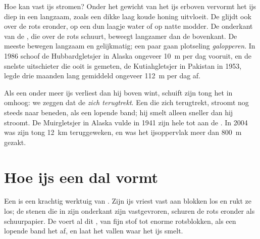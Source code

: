 Hoe kan vast ijs stromen? Onder het gewicht van het ijs erboven vervormt
het ijs diep in een  langzaam, zoals een dikke laag koude honing
uitvloeit. De  glijdt ook over de rots eronder, op een dun laagje
water of op natte modder. De onderkant van de , die over de rots
schuurt, beweegt langzamer dan de bovenkant. De meeste  bewegen
langzaam en gelijkmatig; een paar gaan plotseling \emph{galopperen}. In
1986 schoof de Hubbardgletsjer in Alaska ongeveer \qty{10}{m} per dag
vooruit, en de snelste uitschieter die ooit is gemeten, de
Kutiahgletsjer in Pakistan in 1953, legde drie maanden lang gemiddeld
ongeveer \qty{112}{m} per dag af.

Als een  onder meer ijs verliest dan hij boven wint, schuift zijn
tong het  in omhoog: we zeggen dat de  \emph{zich terugtrekt}.
Een  die zich terugtrekt, stroomt nog steeds naar beneden, als een
lopende band; hij smelt alleen sneller dan hij stroomt. De Muirgletsjer in
Alaska vulde in 1941 zijn hele  tot aan de . In 2004 was zijn tong
\qty{12}{km} teruggeweken, en was het ijsoppervlak meer dan \qty{800}{m}
gezakt.

\section{Hoe ijs een dal vormt}

Een  is een krachtig werktuig van . Zijn ijs vriest vast aan
blokken los  en rukt ze los; de stenen die in zijn onderkant zijn
vastgevroren, schuren de rots eronder als schuurpapier. De  voert
al dit , van fijn stof tot enorme rotsblokken, als een lopende
band het  af, en laat het vallen waar het ijs smelt.

